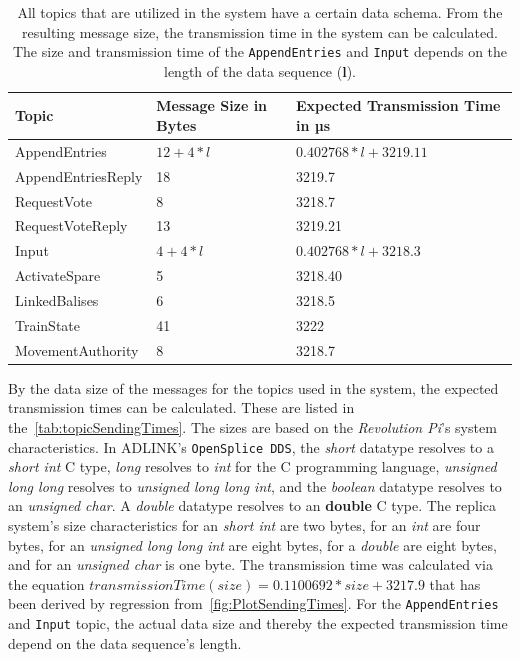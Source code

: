 \begin{table}[h!]
	\begin{center}
		\caption{All topics that are utilized in the system have a certain data schema. From the resulting message size, the transmission time in the system can be calculated. The size and transmission time of the \texttt{AppendEntries} and \texttt{Input} depends on the length of the data sequence (\textbf{l}).}
		\label{tab:topicSendingTimes}
		\begin{tabularx}{\textwidth}{|X|X|X|}
			\hline
			\textbf{Topic} & \textbf{Message Size in Bytes} & \textbf{Expected Transmission Time in µs} \\
			\hline \hline
			AppendEntries & $12 + 4 * l$ & $0.402768 * l + 3219.11$ \\
			\hline
			AppendEntriesReply & 18 & 3219.7 \\
			\hline
			RequestVote & 8 & 3218.7 \\
			\hline
			RequestVoteReply & 13 & 3219.21 \\
			\hline
			Input & $4 + 4 * l$ & $0.402768 * l + 3218.3$ \\
			\hline
			ActivateSpare & 5 & 3218.40 \\
			\hline
			LinkedBalises & 6 & 3218.5 \\
			\hline
			TrainState & 41 & 3222 \\
			\hline
			MovementAuthority & 8 & 3218.7 \\
			\hline
		\end{tabularx}
	\end{center}
\end{table}

By the data size of the messages for the topics used in the system, the expected transmission times can be calculated.
These are listed in the~\autoref{tab:topicSendingTimes}.
The sizes are based on the \textit{Revolution Pi}'s system characteristics.
In ADLINK's \texttt{OpenSplice DDS}, the \textit{short}  datatype resolves to a \textit{short int} C type, \textit{long} resolves to \textit{int} for the C programming language, \textit{unsigned long long} resolves to \textit{unsigned long long int}, and the \textit{boolean} datatype resolves to an \textit{unsigned char}.
A \textit{double}  datatype resolves to an \textbf{double} C type.
The replica system's size characteristics for an \textit{short int} are two bytes, for an \textit{int} are four bytes, for an \textit{unsigned long long int} are eight bytes, for a \textit{double} are eight bytes, and for an \textit{unsigned char} is one byte.
The transmission time was calculated via the equation $transmissionTime(size) = 0.1100692 * size + 3217.9$ that has been derived by regression from~\autoref{fig:PlotSendingTimes}.
For the \texttt{AppendEntries} and \texttt{Input} topic, the actual data size and thereby the expected transmission time depend on the data sequence's length. 

